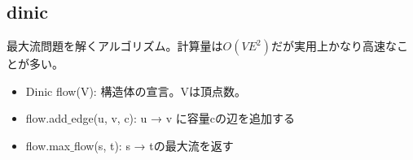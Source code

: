 \subsection{dinic}

最大流問題を解くアルゴリズム。計算量は$O(VE^2)$だが実用上かなり高速なことが多い。

\begin{itemize}
    \item Dinic flow(V): 構造体の宣言。Vは頂点数。
    \item flow.add$\_$edge(u, v, c): u → v に容量cの辺を追加する
    \item flow.max$\_$flow(s, t): s → tの最大流を返す
\end{itemize}

